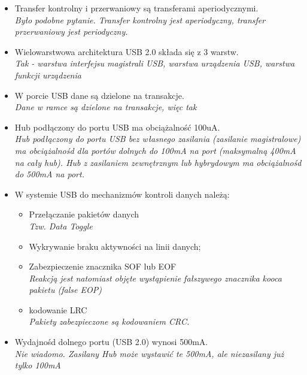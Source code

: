 \documentclass[a4paper,twoside]{article}
\begin{document}
\begin{itemize}
	\item \textcolor{nie}{Transfer kontrolny i przerwaniowy są transferami aperiodycznymi.} \\
	{\small \emph{Było podobne pytanie. Transfer kontrolny jest aperiodyczny, transfer przerwaniowy jest periodyczny.}}
	
	\item \textcolor{tak}{Wielowarstwowa architektura USB 2.0 składa się z 3 warstw.} \\
	{\small \emph{Tak - warstwa interfejsu magistrali USB, warstwa urządzenia USB, warstwa funkcji urządzenia}}
	
	\item \textcolor{tak}{W porcie USB dane są dzielone na transakcje.} \\
	{\small \emph{Dane w ramce są dzielone na transakcje, więc tak}}
	
	\item \textcolor{nie}{Hub podłączony do portu USB ma obciążalność 100uA.} \\
	{\small \emph{Hub podłączony do portu USB bez własnego zasilania (zasilanie magistralowe) ma obciążalnośd dla portów dolnych do 100mA na port (maksymalną 400mA na cały hub). Hub z zasilaniem zewnętrznym lub hybrydowym ma obciążalnośd do 500mA na port.}}
	
	\item {W systemie USB do mechanizmów kontroli danych należą:}
	\begin{itemize}
		\item \textcolor{tak}{Przełączanie pakietów danych} \\
		{\small \emph{Tzw. Data Toggle}}
		
		\item \textcolor{tak}{Wykrywanie braku aktywności na linii danych;}
		
		\item \textcolor{nie}{Zabezpieczenie znacznika SOF lub EOF} \\
		{\small \emph{Reakcją jest natomiast objęte wystąpienie fałszywego znacznika kooca pakietu (false EOP)}}
		
		\item \textcolor{nie}{kodowanie LRC} \\
		{\small \emph{Pakiety zabezpieczone są kodowaniem CRC.}}
	\end{itemize}
	
	\item \textcolor{nie}{Wydajnośd dolnego portu (USB 2.0) wynosi 500mA.} \\
	{\small \emph{Nie wiadomo. Zasilany Hub może wystawić te 500mA, ale niezasilany już tylko 100mA}}
	

\end{itemize}
\end{document}

